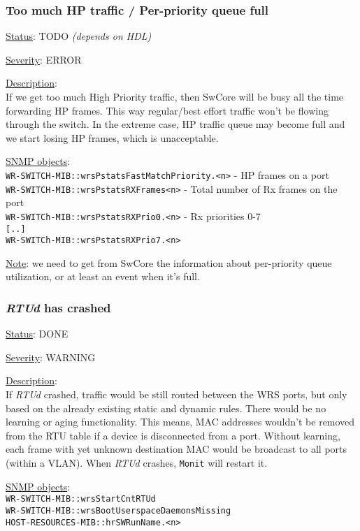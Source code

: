 \subsubsection{\bf Too much HP traffic / Per-priority queue full}
		\label{fail:data:too_much_HP}
		\begin{packed_enum}
			\item [] \underline{Status}: TODO \emph{(depends on HDL)}
			\item [] \underline{Severity}: ERROR
			\item [] \underline{Description}:\\
				If we get too much High Priority traffic, then SwCore will be busy all
				the time forwarding HP frames. This way regular/best effort traffic
				won't be flowing through the switch. In the extreme case, HP traffic
				queue may become full and we start losing HP frames, which is
				unacceptable.
			\item [] \underline{SNMP objects}:\\
				\texttt{WR-SWITCH-MIB::wrsPstatsFastMatchPriority.<n>} - HP frames on a port\\
				\texttt{WR-SWITCH-MIB::wrsPstatsRXFrames<n>} - Total number of Rx frames on
				the port\\
				\texttt{WR-SWITCh-MIB::wrsPstatsRXPrio0.<n>} - Rx priorities 0-7\\
				\texttt{[..]}\\
				\texttt{WR-SWITCh-MIB::wrsPstatsRXPrio7.<n>}
			\item [] \underline{Note}: we need to get from SwCore the information
				about per-priority queue utilization, or at least an event when it's
				full.
		\end{packed_enum}

\subsubsection{\bf \emph{RTUd} has crashed}
		\label{fail:data:rtu_crash}
		\begin{packed_enum}
			\item [] \underline{Status}: DONE
			\item [] \underline{Severity}: WARNING
			\item [] \underline{Description}:\\
				If \emph{RTUd} crashed, traffic would be still routed between the WRS ports, but
				only based on the already existing static and dynamic rules. There would be
				no learning or aging functionality. This means, MAC addresses wouldn't be
				removed from the RTU table if a device is disconnected from a port.
				Without learning, each frame with yet unknown destination MAC would be
				broadcast to all ports (within a VLAN). When \emph{RTUd} crashes,
				\texttt{Monit} will restart it.
			\item [] \underline{SNMP objects}:\\
				\texttt{WR-SWITCH-MIB::wrsStartCntRTUd}\\
				\texttt{WR-SWITCH-MIB::wrsBootUserspaceDaemonsMissing}\\
				\texttt{HOST-RESOURCES-MIB::hrSWRunName.<n>}
		\end{packed_enum}

